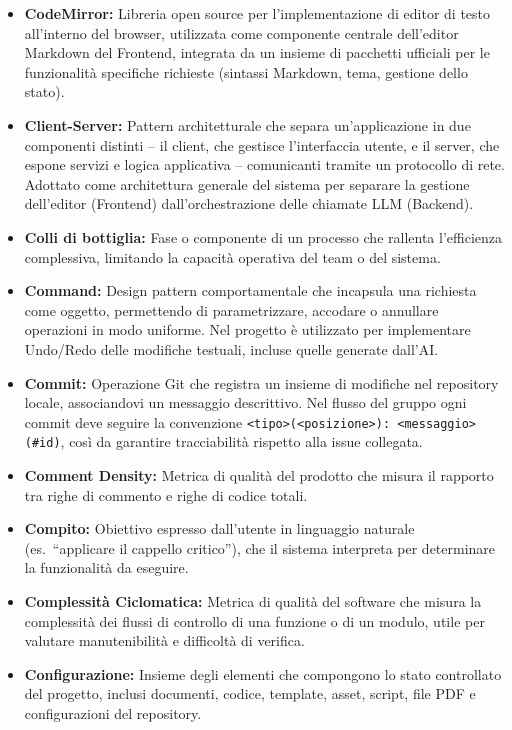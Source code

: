 \begin{itemize}[leftmargin=*]
      \item \textbf{CodeMirror:} Libreria open source per l'implementazione di editor di testo all'interno del browser, utilizzata come componente centrale dell'editor Markdown del Frontend, integrata da un insieme di pacchetti ufficiali per le funzionalità specifiche richieste (sintassi Markdown, tema, gestione dello stato).
      \item \textbf{Client-Server:} Pattern architetturale che separa un'applicazione in due componenti distinti -- il client, che gestisce l'interfaccia utente, e il server, che espone servizi e logica applicativa -- comunicanti tramite un protocollo di rete. Adottato come architettura generale del sistema per separare la gestione dell'editor (Frontend) dall'orchestrazione delle chiamate LLM (Backend).
      \item \textbf{Colli di bottiglia:} Fase o componente di un processo che rallenta l'efficienza complessiva, limitando la capacità operativa del team o del sistema.
      \item \textbf{Command:} Design pattern comportamentale che incapsula una richiesta come oggetto, permettendo di parametrizzare, accodare o annullare operazioni in modo uniforme. Nel progetto è utilizzato per implementare Undo/Redo delle modifiche testuali, incluse quelle generate dall'AI.
      \item \textbf{Commit:} Operazione Git che registra un insieme di modifiche nel
      repository locale, associandovi un messaggio descrittivo. Nel flusso del gruppo
      ogni commit deve seguire la convenzione
      \texttt{<tipo>(<posizione>): <messaggio> (\#id)}, così da garantire
      tracciabilità rispetto alla issue collegata.
      \item \textbf{Comment Density:} Metrica di qualità del prodotto che misura il
      rapporto tra righe di commento e righe di codice totali.
      \item \textbf{Compito:} Obiettivo espresso dall'utente in linguaggio naturale (es.\ ``applicare il cappello critico''), che il sistema interpreta per determinare la funzionalità da eseguire.
      \item \textbf{Complessità Ciclomatica:} Metrica di qualità del software che misura
      la complessità dei flussi di controllo di una funzione o di un modulo, utile per
      valutare manutenibilità e difficoltà di verifica.
      \item \textbf{Configurazione:} Insieme degli elementi che compongono lo stato controllato del progetto, inclusi documenti, codice, template, asset, script, file PDF e configurazioni del repository.

\end{itemize}
